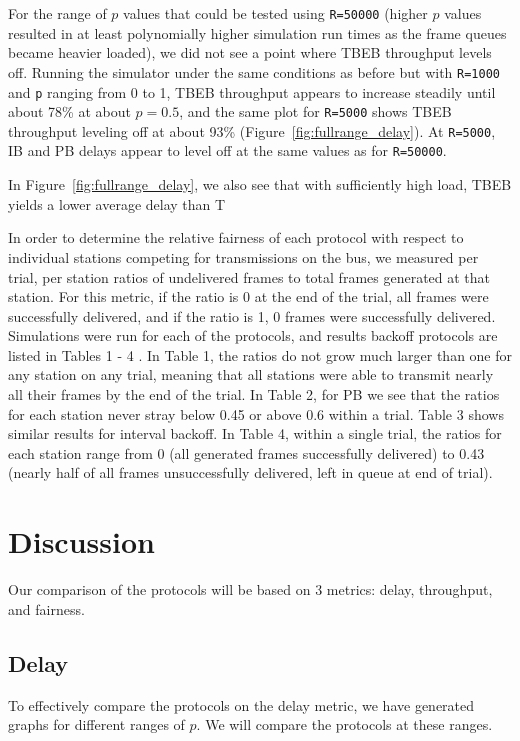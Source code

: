 \documentclass[twocolumn]{article}
\begin{document}
For the range of $p$ values that could be tested using \verb|R=50000| (higher
$p$ values resulted in at least polynomially higher simulation run times as the frame queues
became heavier loaded), we did not see a point where TBEB throughput levels off. Running
the simulator under the same conditions as before but with \verb|R=1000| and \verb|p| ranging
from 0 to 1, TBEB throughput appears to increase steadily until about 78\% at about $p = 0.5$,
and the same plot for \verb|R=5000| shows TBEB throughput leveling off at about 93\% 
(Figure~\ref{fig:fullrange_delay}). At \verb|R=5000|, IB and PB delays appear to level off at the
same values as for \verb|R=50000|.

In Figure~\ref{fig:fullrange_delay}, we also see that with sufficiently high load, TBEB yields
a lower average delay than T

In order to determine the relative fairness of each protocol with respect to individual stations
competing for transmissions on the bus, we measured per trial, per station ratios of 
undelivered frames to total frames generated at that station. For this metric, if the ratio
is 0 at the end of the trial, all frames were successfully delivered, and if the ratio is 1, 0
frames were successfully delivered. Simulations were run for
each of the protocols, and results 
backoff protocols are listed in Tables 1 - 4 . In Table 1, the ratios do not grow much larger 
than one for any station on any trial, meaning that all stations were able to transmit
nearly all their frames by the end of the trial. In Table 2, for PB we see that the
ratios for each station never stray below 0.45 or above 0.6 within a trial. Table 3 shows
similar results for interval backoff. In Table 4,
within a single trial, the ratios for each station range from 0 (all generated frames 
successfully delivered) to 0.43 (nearly half of all frames unsuccessfully delivered, left
in queue at end of trial).



\section*{Discussion}
Our comparison of the protocols will be based on 3 metrics: delay, throughput, and fairness.

\subsection*{Delay} To effectively compare the protocols on the delay metric, we have generated
graphs for different ranges of $p$. We will compare the protocols at these ranges.
\end{document}
